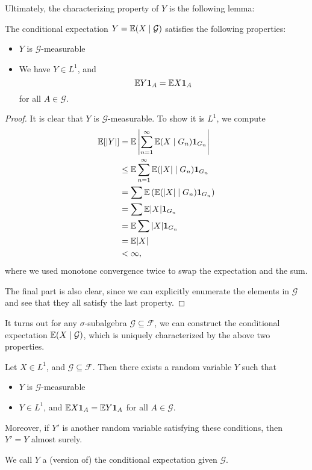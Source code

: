 \documentclass[a4paper]{article}
\begin{document}
Ultimately, the characterizing property of $Y$ is the following lemma:
\begin{lemma}
  The conditional expectation $Y = \mathbb{E}(X \mid \mathcal{G})$ satisfies the following properties:
  \begin{itemize}
    \item $Y$ is $\mathcal{G}$-measurable
    \item We have $Y \in L^1$, and
      \[
        \mathbb{E} Y \mathbf{1}_A = \mathbb{E} X \mathbf{1}_A
      \]
      for all $A \in \mathcal{G}$.
  \end{itemize}
\end{lemma}

\begin{proof}
  It is clear that $Y$ is $\mathcal{G}$-measurable. To show it is $L^1$, we compute
  \begin{align*}
    \mathbb{E}[|Y|] &= \mathbb{E} \left|\sum_{n = 1}^\infty \mathbb{E}(X \mid G_n) \mathbf{1}_{G_n}\right|\\
    &\leq \mathbb{E} \sum_{n =1 }^\infty \mathbb{E}(|X| \mid G_n) \mathbf{1}_{G_n} \\
    &= \sum \mathbb{E} \left( \mathbb{E}(|X| \mid G_n) \mathbf{1}_{G_n}\right)\\
    &= \sum \mathbb{E} |X| \mathbf{1}_{G_n}\\
    &= \mathbb{E} \sum |X| \mathbf{1}_{G_n}\\
    &= \mathbb{E} |X|\\
    &< \infty,
  \end{align*}
  where we used monotone convergence twice to swap the expectation and the sum.

  The final part is also clear, since we can explicitly enumerate the elements in $\mathcal{G}$ and see that they all satisfy the last property.
\end{proof}

It turns out for any $\sigma$-subalgebra $\mathcal{G} \subseteq \mathcal{F}$, we can construct the conditional expectation $\mathbb{E}(X \mid \mathcal{G})$, which is uniquely characterized by the above two properties.

\begin{thm}
  Let $X \in L^1$, and $\mathcal{G} \subseteq \mathcal{F}$. Then there exists a random variable $Y$ such that
  \begin{itemize}
    \item $Y$ is $\mathcal{G}$-measurable
    \item $Y \in L^1$, and $\mathbb{E} X \mathbf{1}_A = \mathbb{E} Y \mathbf{1}_A$ for all $A \in \mathcal{G}$.
  \end{itemize}
  Moreover, if $Y'$ is another random variable satisfying these conditions, then $Y' = Y$ almost surely.

  We call $Y$ a (version of) the conditional expectation given $\mathcal{G}$.
\end{thm}
\end{document}
